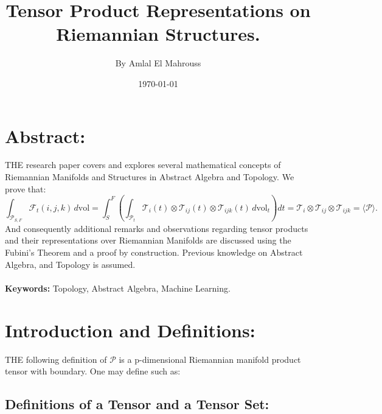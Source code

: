 \documentclass[10pt]{article}
\title{%
	\vspace{-1.5em}%
	\large\textbf{Tensor Product Representations on Riemannian Structures.}%
}
\author{By Amlal El Mahrouss}
\date{\today}
\theoremstyle{plain}
\theoremstyle{definition}
\theoremstyle{remark}
\begin{document}

\maketitle
\tableofcontents
\newpage

\section{Abstract:}

\lettrine[lines=1, lhang=0.1, loversize=0.2]{T}HE research paper covers and explores several mathematical concepts of Riemannian Manifolds and Structures in Abstract Algebra and Topology. We prove that:\\
\begin{equation}
  \int_{\mathcal{P}_{S,F}} \mathcal{F}_t(i,j,k)\,d\mathrm{vol}
  = \int_{S}^{F} \left(\int_{\mathcal{P}_t} \mathcal{T}_i(t) \otimes \mathcal{T}_{ij}(t) \otimes \mathcal{T}_{ijk}(t)\,d\mathrm{vol}_t\right) dt
  = \mathcal{T}_i \otimes \mathcal{T}_{ij} \otimes \mathcal{T}_{ijk}
  = \langle \mathcal{P} \rangle.
\end{equation}
And consequently additional remarks and observations regarding tensor products and their representations over Riemannian Manifolds are discussed using the Fubini's Theorem and a proof by construction. Previous knowledge on Abstract Algebra, and Topology is assumed.\\ \\
\textbf{Keywords: } Topology, Abstract Algebra, Machine Learning.

\section{Introduction and Definitions:}

\lettrine[lines=1, lhang=0.1, loversize=0.2]{T}HE following definition of $\mathcal{P}$ is a p-dimensional Riemannian manifold product tensor with boundary. One may define such as:

\subsection{Definitions of a Tensor and a Tensor Set:}
\end{document}
